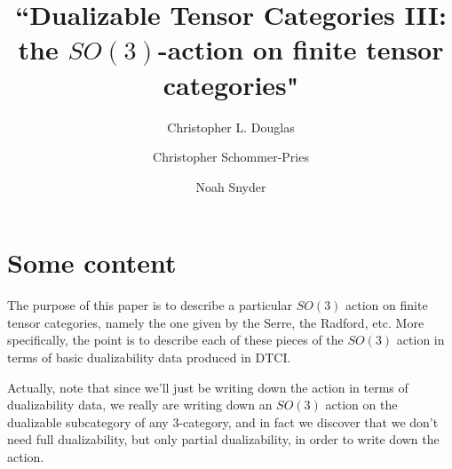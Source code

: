 \documentclass{amsart}
\begin{document}
\title{``Dualizable Tensor Categories III: the $SO(3)$-action on finite tensor categories"}

\author{Christopher L. Douglas}
\address{Mathematical Institute\\ University of Oxford\\ Oxford OX1 3LB\\ United Kingdom}
      	
\author{Christopher Schommer-Pries}
\address{Department of Mathematics\\ Massachusetts Institute of Technology\\ Cambridge, MA 02139\\ USA}

\author{Noah Snyder}
\address{Department of Mathematics\\ Columbia University\\ New York, NY 10027\\ USA}


\maketitle

\tableofcontents

\section{Some content}

The purpose of this paper is to describe a particular $SO(3)$ action on finite tensor categories, namely the one given by the Serre, the Radford, etc.  More specifically, the point is to describe each of these pieces of the $SO(3)$ action in terms of basic dualizability data produced in DTCI.

Actually, note that since we'll just be writing down the action in terms of dualizability data, we really are writing down an $SO(3)$ action on the dualizable subcategory of any 3-category, and in fact we discover that we don't need full dualizability, but only partial dualizability, in order to write down the action.

\end{document}
